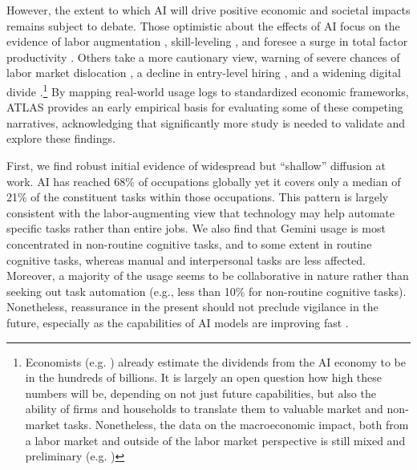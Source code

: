 \documentclass[11pt,a4paper]{article}
\begin{document}
However, the extent to which AI will drive positive economic and societal impacts remains subject to debate. Those optimistic about the effects of AI focus on the evidence of labor augmentation \citep[based on evidence like][]{DellAcqua2026, Noy2023}, skill-leveling \citep[based on evidence like][]{Brynjolfsson2025, Wilmers2024Generative}, and foresee a surge in total factor productivity \citep[as explored in e.g.,][]{brynjolfsson2023macroeconomic, arnon2025projected}. Others take a more cautionary view, warning of severe chances of labor market dislocation \citep[e.g.,][]{amodei2026adolescence}, a decline in entry-level hiring \citep[based on evidence like][]{brynjolfsson2025canaries, HosseiniMaasoum2025, KleinTeeselink2025}, and a widening digital divide \citep[e.g.,][]{Gmyrek2024, gmyrek2026disruption}.\footnote{Economists (e.g. \cite{Nguyen2026}) already estimate the dividends from the AI economy to be in the hundreds of billions. It is largely an open question how high these numbers will be, depending on not just future capabilities, but also the ability of firms and households to translate them to valuable market and non-market tasks. Nonetheless, the data on the macroeconomic impact, both from a labor market and outside of the labor market perspective is still mixed and preliminary (e.g. \cite{kolko2026ai, tedeschi2026decline, NBERw33777})} By mapping real-world usage logs to standardized economic frameworks, ATLAS provides an early empirical basis for evaluating some of these competing narratives, acknowledging that significantly more study is needed to validate and explore these findings.

First, we find robust initial evidence of widespread but ``shallow'' diffusion at work. AI has reached 68\% of occupations globally yet it covers only a median of 21\% of the constituent tasks within those occupations. This pattern is largely consistent with the labor-augmenting view that technology may help automate specific tasks rather than entire jobs. We also find that Gemini usage is most concentrated in non-routine cognitive tasks, and to some extent in routine cognitive tasks, whereas manual and interpersonal tasks are less affected. Moreover, a majority of the usage seems to be collaborative in nature rather than seeking out task automation (e.g., less than 10\% for non-routine cognitive tasks). Nonetheless, reassurance in the present should not preclude vigilance in the future, especially as the capabilities of AI models are improving fast \citep[e.g.][]{metr-2026-time-horizons}.
\end{document}
